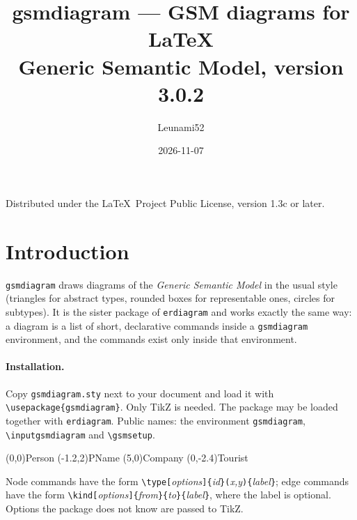 \documentclass[10pt,a4paper]{article}
\title{\textbf{gsmdiagram} --- GSM diagrams for \LaTeX\\[2pt]
  \large Generic Semantic Model, version 3.0.2}
\author{Leunami52}
\date{2026-11-07}
\newcommand\cs[1]{\texttt{\textbackslash#1}}
\newcommand\meta[1]{\textlangle\textit{#1}\textrangle}
\newcommand\opt[1]{\texttt{[}#1\texttt{]}}
\begin{document}
\maketitle
\begin{center}\small Distributed under the \LaTeX\ Project Public License, version 1.3c or later.\end{center}
\tableofcontents

\section{Introduction}

\texttt{gsmdiagram} draws diagrams of the \emph{Generic Semantic Model}
in the usual style (triangles for abstract types, rounded boxes for
representable ones, circles for subtypes). It is
the sister package of \texttt{erdiagram} and works exactly the same way:
a diagram is a list of short, declarative commands inside a
\texttt{gsmdiagram} environment, and the commands exist only inside that
environment.

\paragraph{Installation.} Copy \texttt{gsmdiagram.sty} next to your
document and load it with \verb|\usepackage{gsmdiagram}|. Only TikZ is
needed. The package may be loaded together with \texttt{erdiagram}.
Public names: the environment \texttt{gsmdiagram}, \cs{inputgsmdiagram}
and \cs{gsmsetup}.

\begin{example}
\begin{gsmdiagram}
  (0,0){Person}
  (-1.2,2){PName}
  (5,0){Company}
  (0,-2.4){Tourist}
\end{gsmdiagram}
\end{example}

Node commands have the form
\cs{type}\opt{\meta{options}}\verb|{|\meta{id}\verb|}(|\meta{x,y}\verb|){|\meta{label}\verb|}|;
edge commands have the form
\cs{kind}\opt{\meta{options}}\verb|{|\meta{from}\verb|}{|\meta{to}\verb|}{|\meta{label}\verb|}|,
where the label is optional. Options the package does not know are
passed to TikZ.

\end{document}
